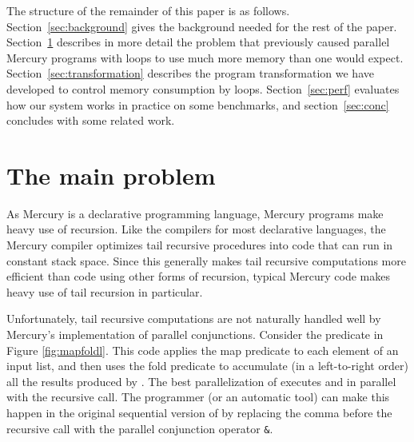 The structure of the remainder of this paper is as follows.
Section~\ref{sec:background} gives
the background needed for the rest of the paper.
Section~\ref{sec:problem} describes in more detail
the problem that previously caused parallel Mercury programs with loops
to use much more memory than one would expect.
Section~\ref{sec:transformation} describes
the program transformation we have developed
to control memory consumption by loops.
Section~\ref{sec:perf} evaluates
how our system works in practice on some benchmarks,
and
section~\ref{sec:conc} concludes with some related work.

\section{The main problem}
\label{sec:problem}

As Mercury is a declarative programming language,
Mercury programs make heavy use of recursion.
Like the compilers for most declarative languages,
the Mercury compiler optimizes tail recursive procedures
into code that can run in constant stack space.
Since this generally makes tail recursive computations
more efficient than code using other forms of recursion,
typical Mercury code makes heavy use of tail recursion in particular.

Unfortunately, tail recursive computations are not naturally handled well
by Mercury's implementation of parallel conjunctions.
Consider the \mapfoldl{} predicate in Figure \ref{fig:mapfoldl}.
This code applies the map predicate  to each element of an input list,
and then uses the fold predicate 
to accumulate (in a left-to-right order) all the results produced by .
The best parallelization of \mapfoldl{} executes
 and  in parallel with the recursive call.
The programmer (or an automatic tool) can make this happen
in the original sequential version of \mapfoldl
by replacing the comma before the recursive call
with the parallel conjunction operator \verb'&'.

